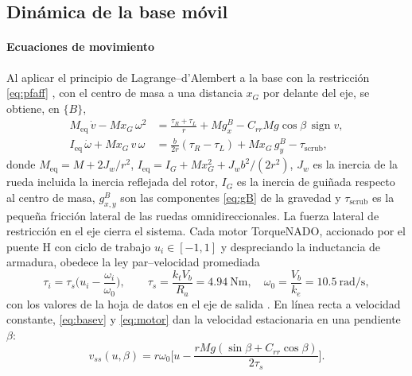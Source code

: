 \subsection{Dinámica de la base móvil}
\label{sec:basedyn}

\paragraph{Ecuaciones de movimiento}
Al aplicar el principio de Lagrange--d'Alembert a la base con la restricción \eqref{eq:pfaff} \cite{fierro1997,siciliano2009}, con el centro de masa a una distancia $x_G$ por delante del eje, se obtiene, en $\{B\}$,
\begin{align}
  M_{\mathrm{eq}}\,\dot v-M x_G\,\omega^2&=\frac{\tau_R+\tau_L}{r}+M g^{B}_x-C_{rr}Mg\cos\beta\,\operatorname{sign}v, \label{eq:basev}\\
  I_{\mathrm{eq}}\,\dot\omega+M x_G\,v\,\omega&=\frac{b}{2r}(\tau_R-\tau_L)+M x_G\,g^{B}_y-\tau_{\mathrm{scrub}}, \label{eq:basew}
\end{align}
donde $M_{\mathrm{eq}}=M+2J_w/r^2$, $I_{\mathrm{eq}}=I_G+Mx_G^2+J_wb^2/(2r^2)$, $J_w$ es la inercia de la rueda incluida la inercia reflejada del rotor, $I_G$ es la inercia de guiñada respecto al centro de masa, $g^{B}_{x,y}$ son las componentes \eqref{eq:gB} de la gravedad y $\tau_{\mathrm{scrub}}$ es la pequeña fricción lateral de las ruedas omnidireccionales. La fuerza lateral de restricción en el eje cierra el sistema. Cada motor TorqueNADO, accionado por el puente H con ciclo de trabajo $u_i\in[-1,1]$ y despreciando la inductancia de armadura, obedece la ley par--velocidad promediada
\begin{equation}
  \tau_i=\tau_s\Big(u_i-\frac{\omega_i}{\omega_0}\Big),\qquad \tau_s=\frac{k_tV_b}{R_a}=\SI{4.94}{\newton\metre},\quad \omega_0=\frac{V_b}{k_e}=\SI{10.5}{\radian\per\second},
  \label{eq:motor}
\end{equation}
con los valores de la hoja de datos en el eje de salida \cite{pitsco_torquenado}. En línea recta a velocidad constante, \eqref{eq:basev} y \eqref{eq:motor} dan la velocidad estacionaria en una pendiente $\beta$:
\begin{equation}
  v_{ss}(u,\beta)=r\omega_0\Big[u-\frac{rMg(\sin\beta+C_{rr}\cos\beta)}{2\tau_s}\Big].
  \label{eq:vss}
\end{equation}
